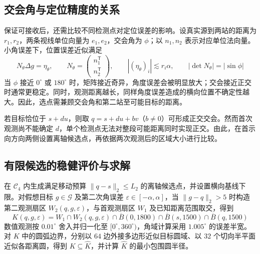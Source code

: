 \documentclass[withoutpreface,bwprint]{cumcmthesis} %
\begin{document}
\subsection{交会角与定位精度的关系}
保证可接收后，还需比较不同检测点对定位误差的影响。设真实源到两站的距离为 $r_1,r_2$，两条视线单位向量为 $e_1,e_2$，交会角为 $\phi$；以 $n_1,n_2$ 表示对应单位法向量。小角误差下，位置误差近似满足
\begin{equation}
 N_\theta\Delta g=\eta_\theta,\qquad
 N_\theta=\begin{pmatrix}n_1^{\mathsf T}\\ n_2^{\mathsf T}\end{pmatrix},\qquad
 |(\eta_\theta)_i|\lesssim r_i\alpha,\qquad |\det N_\theta|=|\sin\phi|
 \label{eq:b26-angle}
\end{equation}
当 $\phi$ 接近 $0^\circ$ 或 $180^\circ$ 时，矩阵接近奇异，角度误差会被明显放大；交会接近正交时通常更稳定。同时，观测距离越长，同样角度误差造成的横向位置不确定性越大。因此，选点需兼顾交会角和第二站至可能目标的距离。

若目标恰位于 $s+du$，则取 $q=s+du+bv$（$b\ne0$）可形成正交交会。然而首次观测尚不能确定 $d$，单个检测点无法对整段可能距离同时实现正交。由此，在首示向方向两侧设置离轴候选点，再依据两次观测后的区域大小进行比较。

\subsection{有限候选的稳健评价与求解}
在 $\mathcal C_4$ 内生成满足移动预算 $\|q-s\|_2\leq L_2$ 的离轴候选点，并设置横向基线下限。对假想目标 $g\in\mathcal G$ 及第二次角误差 $\varepsilon\in[-\alpha,\alpha]$，当 $\|g-q\|_2>5$ 时构造第二观测扇区 $W_2(q,g,\varepsilon)$，与首观测扇区 $W_1$ 及已知距离范围取交，得到
\begin{equation}
 K(q,g,\varepsilon)=W_1\cap W_2(q,g,\varepsilon)
 \cap\overline B(0,1800)\cap\overline B(s,1500)\cap\overline B(q,1500)
 \label{eq:b26-K}
\end{equation}
数值观测按 $0.01^\circ$ 舍入并归一化至 $[0^\circ,360^\circ)$，角域计算采用 $1.005^\circ$ 的误差半宽。对 $K$ 中的圆弧边界，分别以 $64$ 边外接多边形近似目标圆域、以 $32$ 个切向半平面近似各距离圆，得到 $K\subseteq\widehat K$，并计算 $\widehat K$ 的最小包围圆半径。
\end{document}
